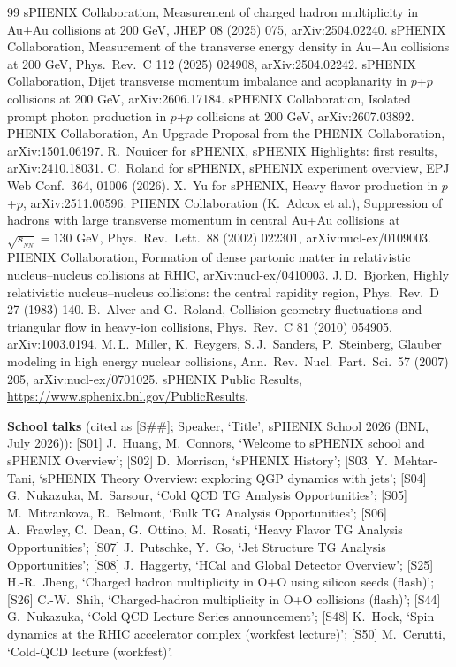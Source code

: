 \documentclass[11pt,letterpaper]{article}
\newcommand{\sqs}{\sqrt{s_{_{NN}}}}
\begin{document}
\begin{thebibliography}{99}
 sPHENIX Collaboration, Measurement of charged hadron multiplicity in Au+Au collisions at 200 GeV, JHEP 08 (2025) 075, arXiv:2504.02240.
 sPHENIX Collaboration, Measurement of the transverse energy density in Au+Au collisions at 200 GeV, Phys.\ Rev.\ C 112 (2025) 024908, arXiv:2504.02242.
 sPHENIX Collaboration, Dijet transverse momentum imbalance and acoplanarity in $p$+$p$ collisions at 200 GeV, arXiv:2606.17184.
 sPHENIX Collaboration, Isolated prompt photon production in $p$+$p$ collisions at 200 GeV, arXiv:2607.03892.
 PHENIX Collaboration, An Upgrade Proposal from the PHENIX Collaboration, arXiv:1501.06197.
 R.\ Nouicer for sPHENIX, sPHENIX Highlights: first results, arXiv:2410.18031.
 C.\ Roland for sPHENIX, sPHENIX experiment overview, EPJ Web Conf.\ 364, 01006 (2026).
 X.\ Yu for sPHENIX, Heavy flavor production in $p$+$p$, arXiv:2511.00596.
 PHENIX Collaboration (K.\ Adcox et al.), Suppression of hadrons with large transverse momentum in central Au+Au collisions at $\sqs=130$ GeV, Phys.\ Rev.\ Lett.\ 88 (2002) 022301, arXiv:nucl-ex/0109003.
 PHENIX Collaboration, Formation of dense partonic matter in relativistic nucleus--nucleus collisions at RHIC, arXiv:nucl-ex/0410003.
 J.\,D.\ Bjorken, Highly relativistic nucleus--nucleus collisions: the central rapidity region, Phys.\ Rev.\ D 27 (1983) 140.
 B.\ Alver and G.\ Roland, Collision geometry fluctuations and triangular flow in heavy-ion collisions, Phys.\ Rev.\ C 81 (2010) 054905, arXiv:1003.0194.
 M.\,L.\ Miller, K.\ Reygers, S.\,J.\ Sanders, P.\ Steinberg, Glauber modeling in high energy nuclear collisions, Ann.\ Rev.\ Nucl.\ Part.\ Sci.\ 57 (2007) 205, arXiv:nucl-ex/0701025.
 sPHENIX Public Results, \url{https://www.sphenix.bnl.gov/PublicResults}.
\end{thebibliography}
\noindent\textbf{School talks} (cited as [S\#\#]; Speaker, `Title', sPHENIX School 2026 (BNL, July 2026)):
[S01] J.\ Huang, M.\ Connors, `Welcome to sPHENIX school and sPHENIX Overview';
[S02] D.\ Morrison, `sPHENIX History';
[S03] Y.\ Mehtar-Tani, `sPHENIX Theory Overview: exploring QGP dynamics with jets';
[S04] G.\ Nukazuka, M.\ Sarsour, `Cold QCD TG Analysis Opportunities';
[S05] M.\ Mitrankova, R.\ Belmont, `Bulk TG Analysis Opportunities';
[S06] A.\ Frawley, C.\ Dean, G.\ Ottino, M.\ Rosati, `Heavy Flavor TG Analysis Opportunities';
[S07] J.\ Putschke, Y.\ Go, `Jet Structure TG Analysis Opportunities';
[S08] J.\ Haggerty, `HCal and Global Detector Overview';
[S25] H.-R.\ Jheng, `Charged hadron multiplicity in O+O using silicon seeds (flash)';
[S26] C.-W.\ Shih, `Charged-hadron multiplicity in O+O collisions (flash)';
[S44] G.\ Nukazuka, `Cold QCD Lecture Series announcement';
[S48] K.\ Hock, `Spin dynamics at the RHIC accelerator complex (workfest lecture)';
[S50] M.\ Cerutti, `Cold-QCD lecture (workfest)'.
\end{document}
